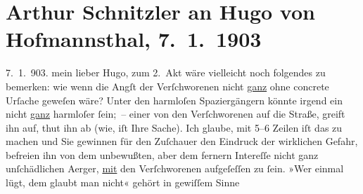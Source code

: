 

         
         \newcommand{\erwaehntePersonen}{Personen: Hugo von Hofmannsthal}
         \newcommand{\erwaehnteInstitutionen}{}
         \newcommand{\erwaehnteOrte}{Orte: Wien}
         \newcommand{\erwaehnteWerke}{Werke: Das gerettete Venedig. Trauerspiel in fünf Aufzügen}
               \section[Arthur Schnitzler an Hugo von Hofmannsthal, 7. 1. 1903]{ Arthur Schnitzler an Hugo von Hofmannsthal, 7. 1. 1903}\nopagebreak{}\rehead{ }\begin{ledgroupsized}[t]{13cm}\normalsize\beginnumbering \toendnotes[C]{\smallbreak\pagebreak[2]} 
\toendnotes[C]{\smallbreak}\pstart
           {\pb}7. 1. 903.\pend
           \pstart
           mein lieber Hugo, zum 2. Akt wäre vielleicht noch folgendes zu bemerken: wie wenn die Angſt der
               Verſchworenen nicht \uline{ganz} ohne concrete Urſache
               geweſen wäre? Unter den harmloſen Spaziergängern könnte irgend ein nicht \uline{ganz} harmloſer ſein; – einer von den Verſchworenen auf
               die Straße, greift ihn auf, thut ihn ab \introOben{}(wie, iſt Ihre
                  Sache)\introOben{}. Ich glaube, mit 5–6 Zeilen iſt das zu machen und Sie gewinnen für
               den Zuſchauer den Eindruck der wirklichen Gefahr, befreien ihn von {\pb}dem unbewußten, aber dem fernern Intereſſe nicht ganz
               unſchädlichen Aerger, \uline{mit} den Verſchworenen
               aufgeſeſſen zu ſein. »Wer einmal lügt, dem glaubt man nicht« gehört in gewiſſem Sinne

\end{ledgroupsized}
